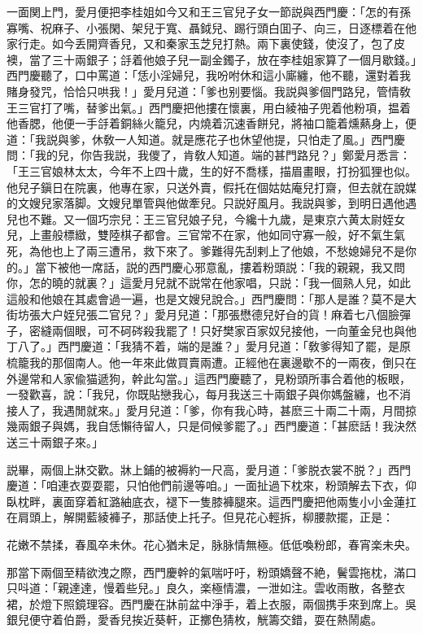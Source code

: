 一面関上門，愛月便把李桂姐如今又和王三官兒子女一節説與西門慶：「怎的有孫寡嘴、祝麻子、小張閑、架兒于寬、聶鉞兒、踢行頭白囬子、向三，日逐標着在他家行走。如今丢開齊香兒，又和秦家玉芝兒打熱。兩下裏使錢，使沒了，包了皮襖，當了三十兩銀子；㧱着他娘子兒一副金鐲子，放在李桂姐家算了一個月歇錢。」西門慶聽了，口中罵道：「恁小淫婦兒，我吩咐休和這小廝纏，他不聽，還對着我賭身發咒，恰恰只哄我！」愛月兒道：「爹也别要惱。我説與爹個門路兒，管情敎王三官打了嘴，替爹出氣。」西門慶把他摟在懷裏，用白綾袖子兜着他粉項，揾着他香腮，他便一手㧱着銅絲火籠兒，内燒着沉速香餅兒，將袖口籠着燻爇身上，便道：「我説與爹，休敎一人知道。就是應花子也休望他提，只怕走了風。」西門慶問：「我的兒，你告我説，我儍了，肯敎人知道。端的甚門路兒？」鄭愛月悉言：「王三官娘林太太，今年不上四十歲，生的好不喬樣，描眉畫眼，打扮狐狸也似。他兒子鎭日在院裏，他專在家，只送外賣，假托在個姑姑庵兒打齋，但去就在說媒的文嫂兒家落脚。文嫂兒單管與他做牽兒。只説好風月。我説與爹，到明日遇他遇兒也不難。又一個巧宗兒：王三官兒娘子兒，今纔十九歲，是東京六黄太尉姪女兒，上畫般標緻，雙陸棋子都會。三官常不在家，他如同守寡一般，好不氣生氣死，為他也上了兩三遭吊，救下來了。爹難得先刮剌上了他娘，不愁媳婦兒不是你的。」當下被他一席話，説的西門慶心邪意亂，摟着粉頭説：「我的親親，我又問你，怎的曉的就裏？」這愛月兒就不説常在他家唱，只説：「我一個熟人兒，如此這般和他娘在其處會過一遍，也是文嫂兒說合。」西門慶問：「那人是誰？莫不是大街坊張大户姪兒張二官兒？」愛月兒道：「那張懋德兒好㒲的貨！麻着七八個臉彈子，密縫兩個眼，可不砢硶殺我罷了！只好樊家百家奴兒接他，一向董金兒也與他丁八了。」西門慶道：「我猜不着，端的是誰？」愛月兒道：「敎爹得知了罷，是原梳籠我的那個南人。他一年來此做買賣兩遭。正經他在裏邊歇不的一兩夜，倒只在外邊常和人家偸猫遞狗，幹此勾當。」這西門慶聽了，見粉頭所事合着他的板眼，一發歡喜，說：「我兒，你既貼戀我心，每月我送三十兩銀子與你媽盤纏，也不消接人了，我遇閒就來。」愛月兒道：「爹，你有我心時，甚麽三十兩二十兩，月間掠幾兩銀子與媽，我自恁懶待留人，只是伺候爹罷了。」西門慶道：「甚麽話！我決然送三十兩銀子來。」

説畢，兩個上牀交歡。牀上鋪的被褥約一尺高，愛月道：「爹脱衣裳不脱？」西門慶道：「咱連衣耍耍罷，只怕他們前邊等咱。」一面扯過下枕來，粉頭解去下衣，仰臥枕畔，裏面穿着紅潞紬底衣，褪下一隻膝褲腿來。這西門慶把他兩隻小小金蓮扛在肩頭上，解開藍綾褲子，那話使上托子。但見花心輕拆，柳腰款擺，正是：

\begin{myquote}
花嫩不禁揉，春風卒未休。花心猶未足，脉脉情無極。低低喚粉郎，春宵楽未央。
\end{myquote}

那當下兩個至精欲洩之際，西門慶幹的氣喘吁吁，粉頭嬌聲不絶，鬢雲拖枕，滿口只呌道：「親達達，慢着些兒。」良久，楽極情濃，一泄如注。雲收雨散，各整衣裙，於燈下照鏡理容。西門慶在牀前盆中淨手，着上衣服，兩個携手來到席上。吳銀兒便守着伯爵，愛香兒挨近葵軒，正擲色猜枚，觥籌交錯，耍在熱鬧處。

